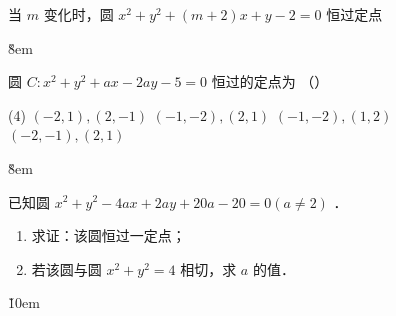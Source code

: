 \begin{example}
    当 $m$ 变化时，圆 $x^2+y^2+(m+2) x+y-2=0$ 恒过定点 \underline{\qquad}
\end{example}

\v{8em}

\begin{example}
    圆 $C: x^2+y^2+a x-2 a y-5=0$ 恒过的定点为 （\qquad）
    \begin{tasks}(4)
        \task $(-2,1),(2,-1)$
        \task $(-1,-2),(2,1)$
        \task $(-1,-2),(1,2)$
        \task $(-2,-1),(2,1)$
    \end{tasks}
\end{example}

\v{8em}

\begin{example}
    已知圆 $x^2+y^2-4 a x+2 a y+20 a-20=0(a \neq 2)$ ．
    \begin{enumerate}
        \item 求证：该圆恒过一定点；
        \item 若该圆与圆 $x^2+y^2=4$ 相切，求 $a$ 的值．
    \end{enumerate}
\end{example}

\v{10em}
